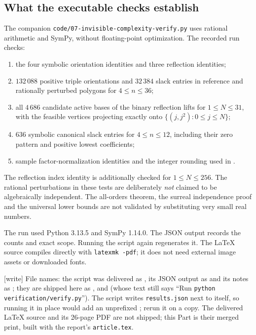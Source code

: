 \documentclass[11pt,a4paper]{article}
\numberwithin{equation}{section}
\theoremstyle{plain}
\newcommand{\wtag}{\textup{[write]}}%
\newcommand{\code}[1]{\texttt{\small #1}}
\begin{document}
\subsection{What the executable checks establish}
The companion \code{code/07-invisible-complexity-verify.py} uses rational arithmetic and
SymPy, without floating-point optimization. The recorded run checks:
\begin{enumerate}[leftmargin=*,itemsep=3pt]
\item the four symbolic orientation identities and three reflection
identities;
\item $132\,088$ positive triple orientations and $32\,384$ slack entries
in reference and rationally perturbed polygons for $4\leq n\leq36$;
\item all $4\,686$ candidate active bases of the binary reflection lifts
for $1\leq N\leq31$, with the feasible vertices projecting exactly onto
$\{(j,j^2):0\leq j\leq N\}$;
\item $636$ symbolic canonical slack entries for $4\leq n\leq12$,
including their zero pattern and positive lowest coefficients;
\item sample factor-normalization identities and the integer rounding
used in .
\end{enumerate}
The reflection index identity is additionally checked for $1\leq N\leq256$.
The rational perturbations in these tests are deliberately \emph{not}
claimed to be algebraically independent. The all-orders theorem, the
surreal independence proof and the universal lower bounds are not
validated by substituting very small real numbers.

The run used Python 3.13.5 and SymPy 1.14.0. The JSON output records the
counts and exact scope. Running the script again regenerates it. The
LaTeX source compiles directly with \code{latexmk -pdf}; it does not need
external image assets or downloaded fonts.

\wtag{} File names: the script was delivered as
, its JSON output as
 and its notes as
; they are shipped here as
,
 and
 (whose text still
says ``Run \texttt{python verification/verify.py}''). The script writes
\texttt{results.json} next to itself, so running it in place would add an
unprefixed ; rerun it on a copy. The delivered
LaTeX source  and its 26-page PDF are not
shipped; this Part is their merged print, built with the report's
\texttt{article.tex}.
\end{document}
